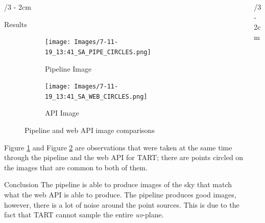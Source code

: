 \documentclass[landscape]{uioposter}
\begin{document}
\begin{frame}
\begin{columns}[onlytextwidth]
\begin{column}{\textwidth/3 - 2cm}
    \begin{block}{Results}
        \vspace{-3cm}
        \begin{figure}
            \begin{subfigure}[b]{0.49\textwidth}
                \texttt{[image: Images/7-11-19\_13:41\_SA\_PIPE\_CIRCLES.png]}
                \caption{Pipeline Image}
                \label{fig:Pipe}
            \end{subfigure}
            \begin{subfigure}[b]{0.49\textwidth}
                \hspace{2cm}
                \texttt{[image: Images/7-11-19\_13:41\_SA\_WEB\_CIRCLES.png]}
                \vspace{1.5cm}
                \caption{API Image}
                \label{fig:API}
            \end{subfigure}
            \caption{Pipeline and web API image comparisons}
            \label{fig:Comparison}
        \end{figure}
        \vspace{-1cm}
        Figure \ref{fig:Pipe} and Figure \ref{fig:API} are observations that were taken at the same time
        through the pipeline and the web API for TART; there are points circled on the images that are common to both of them.
    \end{block}

    \begin{block}{Conclusion}
        The pipeline is able to produce images of the sky that match what the web API is able to produce.
        The pipeline produces good images, however, there is a lot of noise around the point sources. This is due to the fact that TART cannot sample the entire \textit{uv}-plane.
    \end{block}
\end{column}


\begin{column}{\textwidth/3 - 2cm}
    

\end{column}
\end{columns}
\end{frame}
\end{document}

